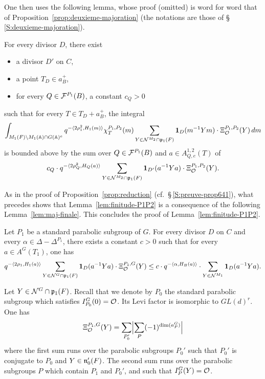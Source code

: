 \begin{paragr}
\begin{preuve}
One then uses the following lemma, whose proof (omitted) is word for word that of Proposition~\ref{prop:deuxieme-majoration} (the notations are those of \S\,\ref{S:deuxieme-majoration}).

\begin{lemme}\label{lem:maj-int}
For every divisor $D$, there exist
\begin{itemize}
\item[--] a divisor $D'$ on $C$,
\item[--] a point $T_D\in a_B^+$,
\item[--] for every $Q\in \mathcal{F}^{P_1}(B)$, a constant $c_Q>0$
\end{itemize}
such that for every $T\in T_D+a_B^+$, the integral
\begin{equation}
  \label{eq:int-a-majorer}
  \int_{M_1(F)\backslash M_1(\mathbb{A})\cap G(\mathbb{A})^e} q^{-\langle 2\rho_1^2,H_1(m)\rangle}\chi_T^{P_1,P_2}(m)\sum_{Y\in \mathcal{N}^{M_2}\cap \mathfrak{p}_1(F)} \mathbf{1}_D(m^{-1}Ym)\cdot \Xi^{P_1,P_2}_{\mathcal{O}}(Y)\, dm
\end{equation}
is bounded above by the sum over $Q\in \mathcal{F}^{P_1}(B)$ and $a\in A^{1,2}_{Q,e}(T)$ of
$$c_Q\cdot q^{-\langle 2\rho_Q^2,H_Q(a)\rangle}\sum_{Y\in \mathcal{N}^{M_2}\cap \mathfrak{p}_1(F)} \mathbf{1}_{D'}(a^{-1}Ya)\cdot \Xi^{P_1,P_2}_{\mathcal{O}}(Y).$$
\end{lemme}

As in the proof of Proposition~\ref{prop:reduction} (cf.\ \S\,\ref{S:preuve-prop641}), what precedes shows that Lemma~\ref{lem:finitude-P1P2} is a consequence of the following Lemma~\ref{lem:maj-finale}. This concludes the proof of Lemma~\ref{lem:finitude-P1P2}.
\end{preuve}

\begin{lemme}\label{lem:maj-finale}
Let $P_1$ be a standard parabolic subgroup of $G$. For every divisor $D$ on $C$ and every $\alpha\in \Delta-\Delta^{P_1}$, there exists a constant $c>0$ such that for every $a\in A^G(T_1)$, one has
$$q^{-\langle 2\rho_1,H_1(a)\rangle}\sum_{Y\in \mathcal{N}^G\cap \mathfrak{p}_1(F)} \mathbf{1}_D(a^{-1}Ya)\cdot \Xi^{P_1,G}_{\mathcal{O}}(Y)\leq c\cdot q^{-\langle \alpha,H_B(a)\rangle}\cdot \sum_{Y\in \mathcal{N}^{M_1}} \mathbf{1}_D(a^{-1}Ya).$$
\end{lemme}

\begin{preuve}
Let $Y\in \mathcal{N}^G\cap \mathfrak{p}_1(F)$. Recall that we denote by $P_0$ the standard parabolic subgroup which satisfies $I^G_{P_0}(0)=\mathcal{O}$. Its Levi factor is isomorphic to $GL(d)^r$. One has
\begin{equation}
  \label{eq:XiPG}
  \Xi^{P_1,G}_{\mathcal{O}}(Y)=\sum_{P_0'}\Bigl|\sum_P (-1)^{\dim(a_P^G)}\Bigr|
\end{equation}
where the first sum runs over the parabolic subgroups $P_0'$ such that $P_0'$ is conjugate to $P_0$ and $Y\in \mathfrak{n}_0'(F)$. The second sum runs over the parabolic subgroups $P$ which contain $P_1$ and $P_0'$, and such that $I_P^G(Y)=\mathcal{O}$.


\end{preuve}
\end{paragr}
